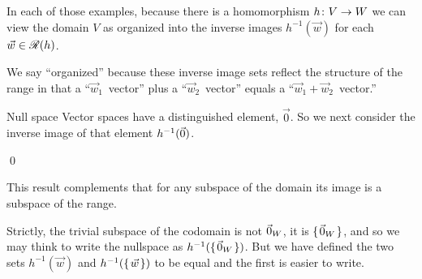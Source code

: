 \documentclass[10pt,t]{beamer}
\begin{document}
\begin{frame}
In each of those examples, because there is a homomorphism
$\mbox{$h\colon V\to W$}$ we can view the domain $V$ as organized into the 
inverse images $h^{-1}(\vec{w})$ for each $\vec{w}\in\mathscr{R}(h)$.

We say ``organized'' because these inverse image sets 
reflect the structure of the range
in that a ``$\vec{w}_1$~vector'' plus a ``$\vec{w}_2$~vector'' 
equals a ``$\vec{w}_1+\vec{w}_2$~vector.''
\end{frame}




\begin{frame}{Null space}
Vector spaces have a distinguished element, $\vec{0}$.
So we next consider the inverse image of that element $h^{-1}(\vec{0})$.
\lm[le:NullspIsSubSp]\hspace*{-1em}

\pause
\pf
{}
\qed

\pause
\medskip
\no
This result complements 
that for any subspace of the domain its image is a subspace of the range.
\end{frame}




\begin{frame}
\df[df:NullSpace]

\pause
\no 
Strictly, the trivial subspace of the codomain is not $\vec{0}_{W}$, it is 
$\mbox{$\{\hspace{0.1em}\vec{0}_{W}\hspace{0.1em}\}$}$, and
so we may think to write the nullspace as $h^{-1}(\mbox{$\{\hspace{0.1em}\vec{0}_{W}\hspace{0.1em}\}$})$.
But we have defined the two sets $h^{-1}(\vec{w})$
and $h^{-1}(\mbox{$\{\hspace{0.1em}\vec{w}\hspace{0.1em}\}$})$ to be equal
and the first is easier to write.
\end{frame}
\end{document}
